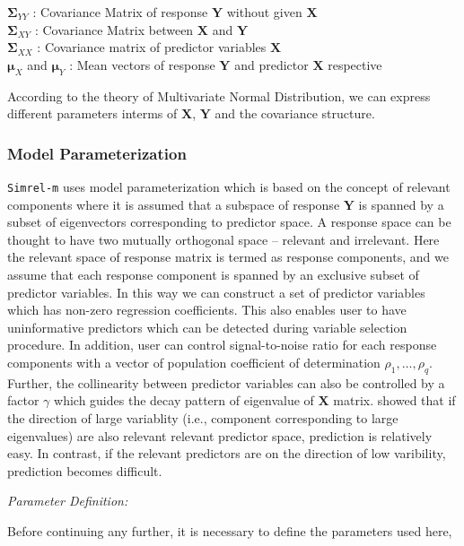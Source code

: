 \documentclass[12pt,a4paperpaper,authoryear]{elsarticle} %
\begin{document}
\(\boldsymbol{\Sigma}_{YY}\) : Covariance Matrix of response
\(\mathbf{Y}\) without given \(\mathbf{X}\)\\
\(\boldsymbol{\Sigma}_{XY}\) : Covariance Matrix between \(\mathbf{X}\)
and \(\mathbf{Y}\)\\
\(\boldsymbol{\Sigma}_{XX}\) : Covariance matrix of predictor variables
\(\mathbf{X}\)\\
\(\boldsymbol{\mu}_X\) and \(\boldsymbol{\mu}_Y\) : Mean vectors of
response \(\mathbf{Y}\) and predictor \(\mathbf{X}\) respective

According to the theory of Multivariate Normal Distribution, we can
express different parameters interms of \(\mathbf{X}\), \(\mathbf{Y}\)
and the covariance structure.

\subsubsection{Model Parameterization}\label{model-parameterization}

\texttt{Simrel-m} uses model parameterization which is based on the
concept of relevant components \citet{helland1994comparison} where it is
assumed that a subspace of response \(\mathbf{Y}\) is spanned by a
subset of eigenvectors corresponding to predictor space. A response
space can be thought to have two mutually orthogonal space -- relevant
and irrelevant. Here the relevant space of response matrix is termed as
response components, and we assume that each response component is
spanned by an exclusive subset of predictor variables. In this way we
can construct a set of predictor variables which has non-zero regression
coefficients. This also enables user to have uninformative predictors
which can be detected during variable selection procedure. In addition,
user can control signal-to-noise ratio for each response components with
a vector of population coefficient of determination
\(\rho_1, \ldots, \rho_q\). Further, the collinearity between predictor
variables can also be controlled by a factor \(\gamma\) which guides the
decay pattern of eigenvalue of \(\mathbf{X}\) matrix.
\citet{helland1994comparison} showed that if the direction of large
variablity (i.e., component corresponding to large eigenvalues) are also
relevant relevant predictor space, prediction is relatively easy. In
contrast, if the relevant predictors are on the direction of low
varibility, prediction becomes difficult.

\emph{Parameter Definition:}

Before continuing any further, it is necessary to define the parameters
used here,
\end{document}
